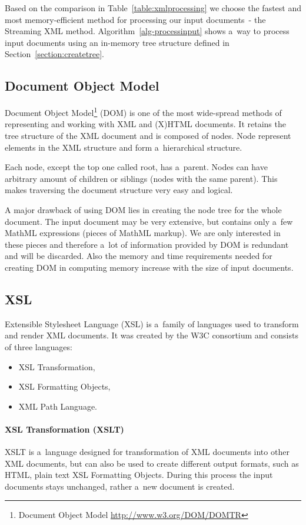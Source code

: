 \documentclass[11pt,oneside,final]{fithesis2}
\begin{document}
Based on the comparison in Table~\ref{table:xmlprocessing} we choose the fastest and most memory-efficient method for processing our input documents~- the Streaming XML method. Algorithm~\ref{alg-processinput} shows a~way to process input documents using an in-memory tree structure defined in Section~\ref{section:createtree}.

\iffalse
\subsection{Document Object Model}
Document Object Model\footnote{Document Object Model \url{http://www.w3.org/DOM/DOMTR}} (DOM) is one of the most wide-spread methods of representing and working with XML and (X)HTML documents. It retains the tree structure of the XML document and is composed of nodes. Node represent elements in the XML structure and form a~hierarchical structure. 

Each node, except the top one called root, has a~parent. Nodes can have arbitrary amount of children or siblings (nodes with the same parent). This makes traversing the document structure very easy and logical. 

A major drawback of using DOM lies in creating the node tree for the whole document. The input document may be very extensive, but contains only a~few MathML expressions (pieces of MathML markup). We are only interested in these pieces and therefore a~lot of information provided by DOM is redundant and will be discarded. Also the memory and time requirements needed for creating DOM in computing memory increase with the size of input documents.

\subsection{XSL}
\label{section:xsl}
Extensible Stylesheet Language (XSL) is a~family of languages used to transform and render XML documents. It was created by the W3C consortium and consists of three languages:
\begin{itemize}
\item XSL Transformation,
\item XSL Formatting Objects,
\item XML Path Language.
\end{itemize}

\paragraph*{XSL Transformation (XSLT)} 
XSLT is a~language designed for transformation of XML documents into other XML documents, but can also be used to create different output formats, such as HTML, plain text XSL Formatting Objects. During this process the input documents stays unchanged, rather a~new document is created. 
\end{document}
